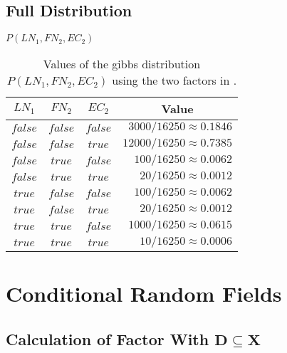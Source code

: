 \subsection{Full Distribution}\label{app:subsec-gd-full-distribution}
\begin{table}[H]
\centering
$P(LN_1,FN_2,EC_2)$\par
\smallskip
\begin{tabular}{c c c r}
 \toprule
 $LN_1$ & $FN_2$ & $EC_2$ & \multicolumn{1}{c}{Value} \\
 \midrule
 $false$ & $false$ & $false$ & $3000/16250\approx0.1846$\\
 $false$ & $false$ & $true$  & $12000/16250\approx0.7385$\\
 $false$ & $true$  & $false$ & $100/16250\approx0.0062$\\
 $false$ & $true$  & $true$  & $20/16250\approx0.0012$\\
 $true$  & $false$ & $false$ & $100/16250\approx0.0062$\\
 $true$  & $false$ & $true$  & $20/16250\approx0.0012$\\
 $true$  & $true$  & $false$ & $1000/16250\approx0.0615$\\
 $true$  & $true$  & $true$  & $10/16250\approx0.0006$\\
 \bottomrule
\end{tabular}
\caption{Values of the \Gls{gibbs distribution} $P(LN_1,FN_2,EC_2)$ using the two \glspl{factor} in .}
\label{tab:example-factor-product}
\end{table}
\section{Conditional Random Fields}\label{app:sec-conditional-random-fields}
\subsection{Calculation of Factor With $\mathbf{D}\subseteq\mathbf{X}$}\label{app:subsec-gd-example-calculation}
